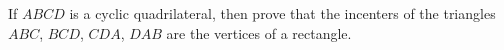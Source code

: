 If $ABCD$ is a cyclic quadrilateral, then prove that the incenters of the triangles $ABC$, $BCD$, $CDA$, $DAB$ are the vertices of a rectangle.